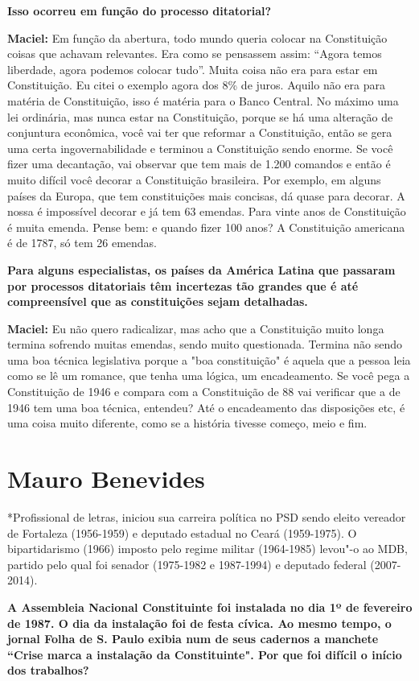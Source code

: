 \textbf{Isso ocorreu em função do processo ditatorial?}

\textbf{Maciel:} Em função da abertura, todo mundo queria colocar na
Constituição coisas que achavam relevantes. Era como se pensassem assim:
``Agora temos liberdade, agora podemos colocar tudo''. Muita coisa não
era para estar em Constituição. Eu citei o exemplo agora dos 8\% de
juros. Aquilo não era para matéria de Constituição, isso é matéria para
o Banco Central. No máximo uma lei ordinária, mas nunca estar na
Constituição, porque se há uma alteração de conjuntura econômica, você
vai ter que reformar a Constituição, então se gera uma certa
ingovernabilidade e terminou a Constituição sendo enorme. Se você fizer
uma decantação, vai observar que tem mais de 1.200 comandos e então é
muito difícil você decorar a Constituição brasileira. Por exemplo, em
alguns países da Europa, que tem constituições mais concisas, dá quase
para decorar. A nossa é impossível decorar e já tem 63 emendas. Para
vinte anos de Constituição é muita emenda. Pense bem: e quando fizer 100
anos? A Constituição americana é de 1787, só tem 26 emendas.

\textbf{Para alguns especialistas, os países da América Latina que
passaram por processos ditatoriais têm incertezas tão grandes que é até
compreensível que as constituições sejam detalhadas.}

\textbf{Maciel:} Eu não quero radicalizar, mas acho que a Constituição
muito longa termina sofrendo muitas emendas, sendo muito questionada.
Termina não sendo uma boa técnica legislativa porque a "boa
constituição" é aquela que a pessoa leia como se lê um romance, que
tenha uma lógica, um encadeamento. Se você pega a Constituição de 1946 e
compara com a Constituição de 88 vai verificar que a de 1946 tem uma boa
técnica, entendeu? Até o encadeamento das disposições etc, é uma coisa
muito diferente, como se a história tivesse começo, meio e fim.

\section{Mauro Benevides}

*Profissional de letras, iniciou sua carreira política no PSD sendo
eleito vereador de Fortaleza (1956-1959) e deputado estadual no Ceará
(1959-1975). O bipartidarismo (1966) imposto pelo regime militar
(1964-1985) levou"-o ao MDB, partido pelo qual foi senador (1975-1982 e
1987-1994) e deputado federal (2007-2014).

\textbf{A Assembleia Nacional Constituinte foi instalada no dia 1º de
fevereiro de 1987. O dia da instalação foi de festa cívica. Ao mesmo
tempo, o jornal Folha de S. Paulo exibia num de seus cadernos a manchete
``Crise marca a instalação da Constituinte". Por que foi difícil o
início dos trabalhos?}

